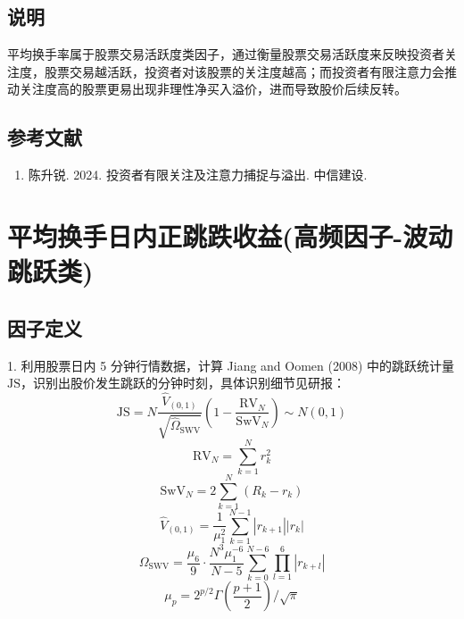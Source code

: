 \documentclass{article}
\begin{document}
\subsection{说明}
平均换手率属于股票交易活跃度类因子，通过衡量股票交易活跃度来反映投资者关注度，股票交易越活跃，投资者对该股票的关注度越高；而投资者有限注意力会推动关注度高的股票更易出现非理性净买入溢价，进而导致股价后续反转。

\subsection{参考文献}
\begin{enumerate}
    \item 陈升锐. 2024. 投资者有限关注及注意力捕捉与溢出. 中信建设.
\end{enumerate}

\section{平均换手日内正跳跌收益(高频因子-波动跳跃类)}

\subsection{因子定义}

1. 利用股票日内 5 分钟行情数据，计算 Jiang and Oomen (2008) 中的跳跃统计量 \( \mathrm{JS} \)，识别出股价发生跳跃的分钟时刻，具体识别细节见研报：
\begin{equation}
    \mathrm{JS} = N \frac{\hat{V}_{(0,1)}}{\sqrt{\hat{\Omega}_{\mathrm{SWV}}}} \left( 1 - \frac{\mathrm{RV}_N}{\mathrm{SwV}_N} \right) \sim N(0,1)
\end{equation}
\begin{equation}
    \mathrm{RV}_N = \sum_{k=1}^{N} r_k^2
\end{equation}
\begin{equation}
    \mathrm{SwV}_N = 2 \sum_{k=1}^{N} (R_k - r_k)
\end{equation}
\begin{equation}
    \hat{V}_{(0,1)} = \frac{1}{\mu_1^2} \sum_{k=1}^{N-1} |r_{k+1}| |r_k|
\end{equation}
\begin{equation}
    \Omega_{\mathrm{SWV}} = \frac{\mu_6}{9} \cdot \frac{N^3 \mu_1^{-6}}{N - 5} \sum_{k=0}^{N-6} \prod_{l=1}^{6} |r_{k+l}|
\end{equation}
\begin{equation}
    \mu_p = 2^{p/2} \Gamma \left( \frac{p+1}{2} \right) / \sqrt{\pi}
\end{equation}
\end{document}
